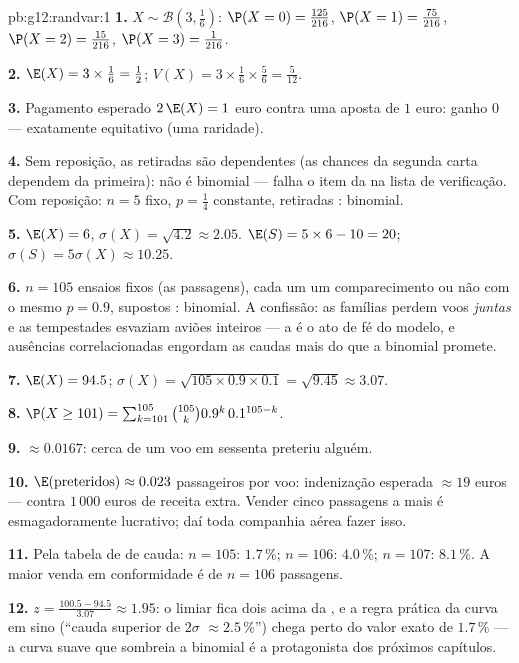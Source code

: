 \begin{solution}{pb:g12:randvar:1}
\textbf{1.} $X \sim \mathcal B\!\left(3, \frac16\right)$:
$\P(X = 0) = \frac{125}{216}$,
$\P(X = 1) = \frac{75}{216}$,
$\P(X = 2) = \frac{15}{216}$,
$\P(X = 3) = \frac{1}{216}$.

\textbf{2.} $\E(X) = 3 \times \frac16 = \frac12$;
$V(X) = 3 \times \frac16 \times \frac56 = \frac{5}{12}$.

\textbf{3.} Pagamento esperado $2\,\E(X) = 1$ euro contra uma
aposta de $1$ euro: ganho $0$ --- exatamente equitativo (uma
raridade).

\textbf{4.} Sem reposição, as retiradas são dependentes (as
chances da segunda carta dependem da primeira): não é binomial
--- falha o item da  na lista de verificação. Com
reposição: $n = 5$ fixo, $p = \frac14$ constante, retiradas
: binomial.

\textbf{5.} $\E(X) = 6$, $\sigma(X) = \sqrt{4.2} \approx
2.05$. $\E(S) = 5 \times 6 - 10 = 20$;
$\sigma(S) = 5\sigma(X) \approx 10.25$.

\textbf{6.} $n = 105$ ensaios fixos (as passagens), cada um um
comparecimento ou não com o mesmo $p = 0.9$, supostos
: binomial. A confissão: as famílias perdem voos
\emph{juntas} e as tempestades esvaziam aviões inteiros --- a
 é o ato de fé do modelo, e ausências
correlacionadas engordam as caudas mais do que a binomial
promete.

\textbf{7.} $\E(X) = 94.5$;
$\sigma(X) = \sqrt{105 \times 0.9 \times 0.1} =
\sqrt{9.45} \approx 3.07$.

\textbf{8.} $\P(X \geq 101) = \sum_{k=101}^{105}
\binom{105}{k} 0.9^k\, 0.1^{105 - k}$.

\textbf{9.} $\approx 0.0167$: cerca de um voo em sessenta
preteriu alguém.

\textbf{10.} $\E(\text{preteridos}) \approx 0.023$ passageiros
por voo: indenização esperada $\approx 19$ euros --- contra
$1\,000$ euros de receita extra. Vender cinco passagens a mais
é esmagadoramente lucrativo; daí toda companhia aérea fazer
isso.

\textbf{11.} Pela tabela de  de cauda:
$n = 105$: $1.7\,\%$; $n = 106$: $4.0\,\%$; $n = 107$:
$8.1\,\%$. A maior venda em conformidade é de $n = 106$
passagens.

\textbf{12.} $z = \frac{100.5 - 94.5}{3.07} \approx 1.95$: o
limiar fica dois  acima da , e a regra
prática da curva em sino (``cauda superior de $2\sigma$
$\approx 2.5\,\%$'') chega perto do valor exato de $1.7\,\%$
--- a curva suave que sombreia a binomial é a protagonista dos
próximos capítulos.


\end{solution}
